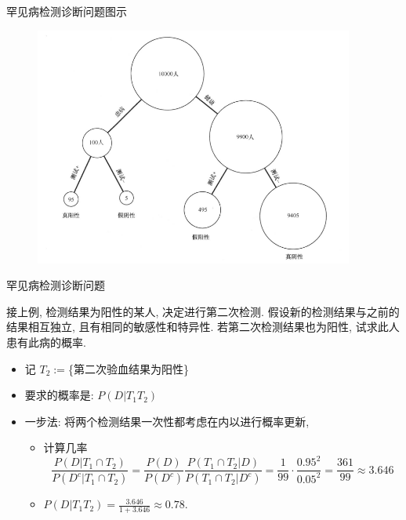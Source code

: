 \begin{frame}{罕见病检测诊断问题图示}
	\begin{figure}%
		\centering
		\includegraphics[width=10.5cm]{figures/ch1-bayes-disease.png}
	  \end{figure}

\end{frame}

\begin{frame}{罕见病检测诊断问题}
	\begin{exam} 接上例, 检测结果为阳性的某人, 决定进行第二次检测. 假设新的检测结果与之前的结果相互独立, 且有相同的敏感性和特异性. 若第二次检测结果也为阳性, 试求此人患有此病的概率.
	\end{exam}
	\pause

	\begin{jieda}
		\begin{itemize}[<+-|alert@+>]
			\item 记 %
			$T_{2}:=$\{第二次验血结果为阳性\}
			\item 要求的概率是: $P(D|T_{1}T_{2})$%
			\item 一步法: 将两个检测结果一次性都考虑在内以进行概率更新,
			\begin{itemize}[<+-|alert@+>]
			\item 计算几率
            $$\frac{P(D|T_1\cap T_2)}{P(D^c|T_1\cap T_2)}=\frac{P(D)}{P(D^c)}\frac{P(T_1\cap T_2|D)}{P(T_1\cap T_2|D^c)}=\frac{1}{99}\cdot \frac{0.95^2}{0.05^2}=\frac{361}{99}\approx 3.646$$
			\item $P(D|T_{1}T_{2})=\frac{3.646}{1+3.646}\approx 0.78$.
			\end{itemize}
		\end{itemize}
	\end{jieda}
\end{frame}

